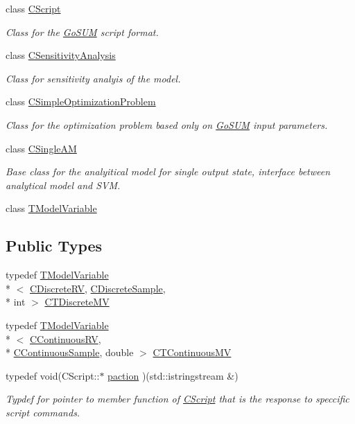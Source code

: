 \begin{DoxyCompactItemize}
class \hyperlink{class_go_s_u_m_1_1_c_script}{C\-Script}
\begin{DoxyCompactList}\small\item\em Class for the \hyperlink{struct_go_s_u_m}{Go\-S\-U\-M} script format. \end{DoxyCompactList}\item 
class \hyperlink{class_go_s_u_m_1_1_c_sensitivity_analysis}{C\-Sensitivity\-Analysis}
\begin{DoxyCompactList}\small\item\em Class for sensitivity analyis of the model. \end{DoxyCompactList}\item 
class \hyperlink{class_go_s_u_m_1_1_c_simple_optimization_problem}{C\-Simple\-Optimization\-Problem}
\begin{DoxyCompactList}\small\item\em Class for the optimization problem based only on \hyperlink{struct_go_s_u_m}{Go\-S\-U\-M} input parameters. \end{DoxyCompactList}\item 
class \hyperlink{class_go_s_u_m_1_1_c_single_a_m}{C\-Single\-A\-M}
\begin{DoxyCompactList}\small\item\em Base class for the analyitical model for single output state, interface between analytical model and S\-V\-M. \end{DoxyCompactList}\item 
class \hyperlink{class_go_s_u_m_1_1_t_model_variable}{T\-Model\-Variable}
\end{DoxyCompactItemize}
\subsection*{Public Types}
\begin{DoxyCompactItemize}
\item 
typedef \hyperlink{class_go_s_u_m_1_1_t_model_variable}{T\-Model\-Variable}\\*
$<$ \hyperlink{class_c_discrete_r_v}{C\-Discrete\-R\-V}, \hyperlink{class_c_discrete_sample}{C\-Discrete\-Sample}, \\*
int $>$ \hyperlink{struct_go_s_u_m_a01b6cebf4ea9040d57b9f38e5eb08dc6}{C\-T\-Discrete\-M\-V}
\item 
typedef \hyperlink{class_go_s_u_m_1_1_t_model_variable}{T\-Model\-Variable}\\*
$<$ \hyperlink{class_c_continuous_r_v}{C\-Continuous\-R\-V}, \\*
\hyperlink{class_c_continuous_sample}{C\-Continuous\-Sample}, double $>$ \hyperlink{struct_go_s_u_m_aa0c068def5d06781c14bbf6cc0074c56}{C\-T\-Continuous\-M\-V}
\item 
typedef void(C\-Script\-::$\ast$ \hyperlink{struct_go_s_u_m_a66b78848987ba5d005b4e86b8a1aef37}{paction} )(std\-::istringstream \&)
\begin{DoxyCompactList}\small\item\em Typdef for pointer to member function of \hyperlink{class_go_s_u_m_1_1_c_script}{C\-Script} that is the response to speccific script commands. \end{DoxyCompactList}\end{DoxyCompactItemize}
